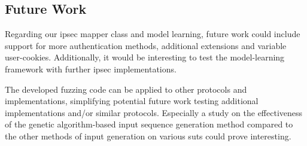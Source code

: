 \subsection{Future Work}
Regarding our \ac{ipsec} mapper class and model learning, future work could include support for more authentication methods, additional extensions and variable user-cookies. Additionally, it would be interesting to test the model-learning framework with further \ac{ipsec} implementations.

The developed fuzzing code can be applied to other protocols and implementations, simplifying potential future work testing additional implementations and/or similar protocols. Especially a study on the effectiveness of the genetic algorithm-based input sequence generation method compared to the other methods of input generation on various \acp{sut} could prove interesting.